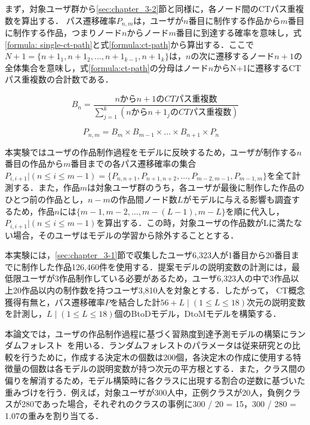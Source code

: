 \documentclass[submit,ses,noauthor]{ipsj}
\begin{document}
まず，対象ユーザ群から\ref{sec:chapter_3-2}節と同様に，各ノード間のCTパス重複数を算出する．
パス遷移確率$P_{n,m}$は，ユーザが$n$番目に制作する作品から$m$番目に制作する作品，つまりノード$n$からノード$m$番目に到達する確率を意味し，式\ref{formula: single-ct-path}と式\ref{formula:ct-path}から算出する．ここで$N+1=\{ {n + 1}_1, {n + 1}_2,\ldots,{n + 1}_{k-1}, {n + 1}_k  \}$は，$n$の次に遷移するノード$n+1$の全体集合を意味し，式\ref{formula:ct-path}の分母はノード$n$からN+1に遷移するCTパス重複数の合計数である．

\begin{equation}
  B_n = \frac{nからn+1のCT
  パス重複数}{\sum_{j=1}^{k} (nからn+1_jのCTパス重複数)} \label{formula: single-ct-path}
\end{equation}


\begin{equation}\label{formula:ct-path}
  P_{n,m} = B_m \times B_{m-1} \times \ldots \times B_{n+1} \times P_n \quad 
\end{equation}

本実験ではユーザの作品制作過程をモデルに反映するため，ユーザが制作する$n$番目の作品から$m$番目までの各パス遷移確率の集合$P_{i,i+1}|(n \leq i \leq m - 1)=\{P_{n,n+1}, P_{n+1,n+2}, \dots, P_{m-2, m-1}, P_{m-1, m}\}$を全て計測する．また，作品$m$は対象ユーザ群のうち，各ユーザが最後に制作した作品のひとつ前の作品とし，$n-m$の作品間ノード数$L$がモデルに与える影響も調査するため，作品$n$には$\{m-1, m-2,\dots, m-(L-1), m-L\}$を順に代入し，$P_{i,i+1}|(n \leq i \leq m - 1)$を算出する．この時，対象ユーザの作品数がLに満たない場合，そのユーザはモデルの学習から除外することとする．

本実験には，\ref{sec:chapter_3-1}節で収集したユーザ6,323人が1番目から20番目までに制作した作品126,460件を使用する．提案モデルの説明変数の計測には，最低限ユーザが3作品制作している必要があるため，ユーザ6,323人の中で3作品以上20作品以内の制作数を持つユーザ3,810人を対象とする．したがって，
CT概念獲得有無と，パス遷移確率$P$を結合した計$56+L \mid (1 \leq L \leq 18)$次元の説明変数を計測し，$L\mid (1 \leq L \leq 18)$個のBtoDモデル，DtoMモデルを構築する．

本論文では，ユーザの作品制作過程に基づく習熟度到達予測モデルの構築にランダムフォレスト~\cite{Breiman_2001}を用いる．ランダムフォレストのパラメータは従来研究との比較を行うために，作成する決定木の個数は200個，各決定木の作成に使用する特徴量の個数は各モデルの説明変数が持つ次元の平方根とする．また，クラス間の偏りを解消するため，モデル構築時に各クラスに出現する割合の逆数に基づいた重みづけを行う．例えば，対象ユーザが300人中，正例クラスが20人，負例クラスが280であった場合，それぞれのクラスの事例に300 / 20 = 15，300 / 280 = 1.07の重みを割り当てる．
\end{document}

